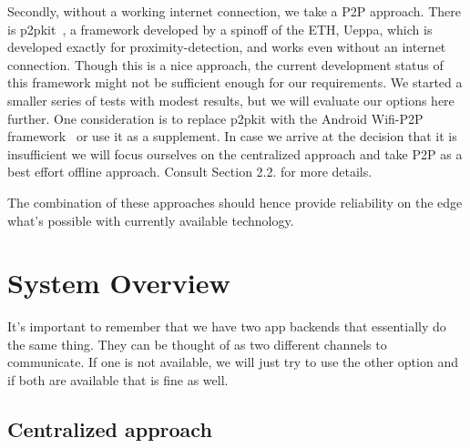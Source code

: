 \documentclass{report}
\begin{document}
Secondly, without a working internet connection, we take a P2P approach. There is p2pkit~\cite{p2pkit}, a framework developed by a spinoff of the ETH, Ueppa, which is developed exactly for proximity-detection, and works even without an internet connection. Though this is a nice approach, the current development status of this framework might not be sufficient enough for our requirements. We started a smaller series of tests with modest results, but we will evaluate our options here further. One consideration is to replace p2pkit with the Android Wifi-P2P framework~\cite{android_wifi_p2p} or use it as a supplement. In case we arrive at the decision that it is insufficient we will focus ourselves on the centralized approach and take P2P as a best effort offline approach. Consult Section 2.2. for more details.

The combination of these approaches should hence provide reliability on the edge what’s possible with currently available technology.

\section{System Overview}

It's important to remember that we have two app backends that essentially do the same thing. They can be thought of as two different channels to communicate. If one is not available, we will just try to use the other option and if both are available that is fine as well.

\subsection{Centralized approach}
\end{document}
